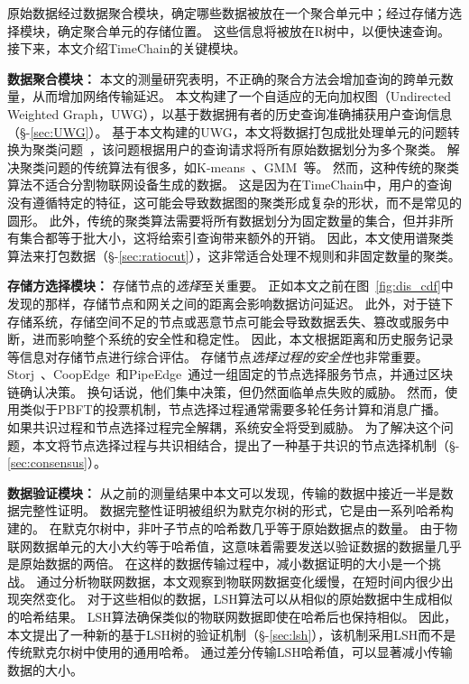 原始数据经过数据聚合模块，确定哪些数据被放在一个聚合单元中；经过存储方选择模块，确定聚合单元的存储位置。
这些信息将被放在R树中，以便快速查询。
接下来，本文介绍TimeChain的关键模块。

\textbf{数据聚合模块：}
本文的测量研究表明，不正确的聚合方法会增加查询的跨单元数量，从而增加网络传输延迟。
本文构建了一个自适应的无向加权图（Undirected Weighted Graph，UWG），以基于数据拥有者的历史查询准确捕获用户查询信息（§-\ref{sec:UWG}）。
基于本文构建的UWG，本文将数据打包成批处理单元的问题转换为聚类问题~\cite{xu2005survey}，该问题根据用户的查询请求将所有原始数据划分为多个聚类。
解决聚类问题的传统算法有很多，如K-means~\cite{kanungo2002efficient}、GMM~\cite{he2010laplacian}等。
然而，这种传统的聚类算法不适合分割物联网设备生成的数据。
这是因为在TimeChain中，用户的查询没有遵循特定的特征，这可能会导致数据图的聚类形成复杂的形状，而不是常见的圆形。
此外，传统的聚类算法需要将所有数据划分为固定数量的集合，但并非所有集合都等于批大小，这将给索引查询带来额外的开销。
因此，本文使用谱聚类算法来打包数据（§-\ref{sec:ratiocut}），这非常适合处理不规则和非固定数量的聚类。

\textbf{存储方选择模块：}
存储节点的\textit{选择}至关重要。
正如本文之前在图~\autoref{fig:dis_cdf}中发现的那样，存储节点和网关之间的距离会影响数据访问延迟。
此外，对于链下存储系统，存储空间不足的节点或恶意节点可能会导致数据丢失、篡改或服务中断，进而影响整个系统的安全性和稳定性。
因此，本文根据距离和历史服务记录等信息对存储节点进行综合评估。
存储节点\textit{选择过程的安全性}也非常重要。
Storj~\cite{storj2018storj}、CoopEdge~\cite{yuan2021coopedge}和PipeEdge~\cite{yuan2023pipeedge}通过一组固定的节点选择服务节点，并通过区块链确认决策。
换句话说，他们集中决策，但仍然面临单点失败的威胁。
然而，使用类似于PBFT的投票机制，节点选择过程通常需要多轮任务计算和消息广播。
如果共识过程和节点选择过程完全解耦，系统安全将受到威胁。
为了解决这个问题，本文将节点选择过程与共识相结合，提出了一种基于共识的节点选择机制（§-\ref{sec:consensus}）。

\textbf{数据验证模块：}
从之前的测量结果中本文可以发现，传输的数据中接近一半是数据完整性证明。
数据完整性证明被组织为默克尔树的形式，它是由一系列哈希构建的。
在默克尔树中，非叶子节点的哈希数几乎等于原始数据点的数量。
由于物联网数据单元的大小大约等于哈希值，这意味着需要发送以验证数据的数据量几乎是原始数据的两倍。
在这样的数据传输过程中，减小数据证明的大小是一个挑战。
通过分析物联网数据，本文观察到物联网数据变化缓慢，在短时间内很少出现突然变化。
对于这些相似的数据，LSH算法可以从相似的原始数据中生成相似的哈希结果。
LSH算法确保类似的物联网数据即使在哈希后也保持相似。
因此，本文提出了一种新的基于LSH树的验证机制（§-\ref{sec:lsh}），该机制采用LSH而不是传统默克尔树中使用的通用哈希。
通过差分传输LSH哈希值，可以显著减小传输数据的大小。

